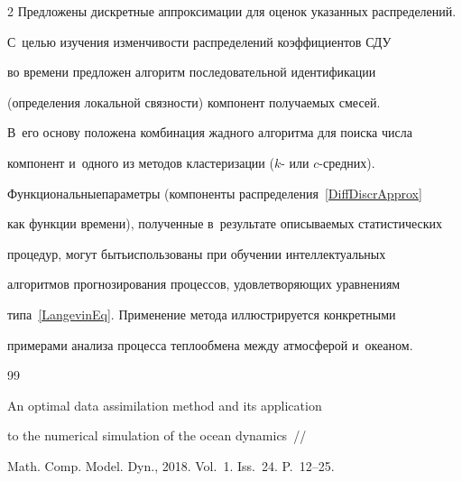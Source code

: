 \begin{multicols}{2}
Предложены дискретные аппроксимации для оценок указанных распределений. 

С~целью изучения из\-мен\-чи\-вости распределений коэффициентов СДУ 

во времени пред\-ло\-жен алгоритм последовательной идентификации 

(определения локальной связ\-ности) компонент получаемых смесей. 

В~его основу положена комбинация жад\-но\-го алгоритма для поиска чис\-ла 

компонент и~одного из методов клас\-те\-ри\-за\-ции ($k$- или $c$-сред\-них). 

Функциональные\linebreak па\-ра\-мет\-ры (компоненты распределения~\eqref{DiffDiscrApprox} 

как функции времени), полученные в~результате опи\-сы\-ва\-емых статистических 

процедур, могут быть\linebreak использованы при обучении интеллектуальных 

алгоритмов прогнозирования процессов, удовле\-тво\-ря\-ющих уравнениям 

типа~\eqref{LangevinEq}. Применение метода иллюстрируется конкретными 

примерами анализа процесса теп\-ло\-об\-ме\-на между атмосферой и~океаном.



\vspace*{-9pt}



{\small\frenchspacing

 {%


\vspace*{-3pt}





 \begin{thebibliography}{99}



An optimal data assimilation method and its application 

to the numerical simulation of the ocean dynamics~// 

Math. Comp. Model. Dyn., 2018. Vol.~1. Iss.~24. P.~12--25.




\end{thebibliography}}}
\end{multicols}
